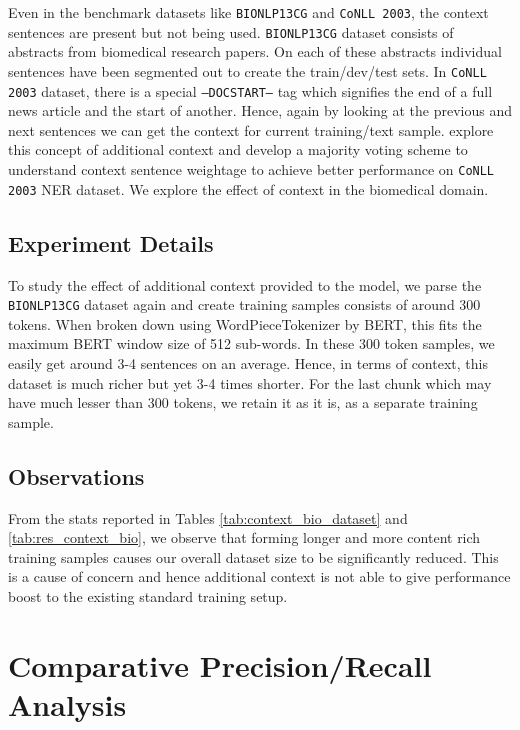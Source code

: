 Even in the benchmark datasets like \texttt{BIONLP13CG} and \texttt{CoNLL 2003}, the context sentences are present but not being used. \texttt{BIONLP13CG} dataset consists of abstracts from biomedical research papers. On each of these abstracts individual sentences have been segmented out to create the train/dev/test sets. In \texttt{CoNLL 2003} dataset, there is a special \texttt{--DOCSTART--} tag which signifies the end of a full news article and the start of another. Hence, again by looking at the previous and next sentences we can get the context for current training/text sample. \cite{luoma2020exploring} explore this concept of additional context and develop a majority voting scheme to understand context sentence weightage to achieve better performance on \texttt{CoNLL 2003} NER dataset. We explore the effect of context in the biomedical domain.

\subsection{Experiment Details}
To study the effect of additional context provided to the model, we parse the \texttt{BIONLP13CG} dataset again and create training samples consists of around 300 tokens. When broken down using WordPieceTokenizer by BERT, this fits the maximum BERT window size of 512 sub-words. In these 300 token samples, we easily get around 3-4 sentences on an average. Hence, in terms of context, this dataset is much richer but yet 3-4 times shorter. For the last chunk which may have much lesser than 300 tokens, we retain it as it is, as a separate training sample.

\subsection{Observations}
From the stats reported in Tables \ref{tab:context_bio_dataset} and \ref{tab:res_context_bio}, we observe that forming longer and more content rich training samples causes our overall dataset size to be significantly reduced. This is a cause of concern and hence additional context is not able to give performance boost to the existing standard training setup.

\section{Comparative Precision/Recall Analysis}

